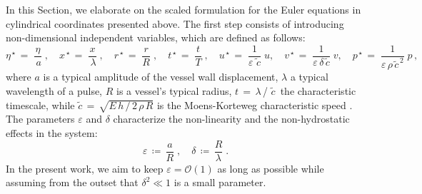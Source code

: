 \documentclass[alpha-refs, 12pt]{wiley-article}
\renewcommand{\O}{\mathcal{O}}
\newcommand{\eps}{\varepsilon}
\begin{document}
In this Section, we elaborate on the scaled formulation for the Euler equations in cylindrical coordinates presented above. The first step consists of introducing non-dimensional independent variables, which are defined as follows:
\begin{equation*}
  \eta^{\,\star}\,=\;\frac{\eta}{\,a}\;,\quad x^{\,\star}\,=\;\frac{x}{\,\lambda}\;,\quad r^{\,\star}\,=\;\frac{r}{R}\;,\quad t^{\,\star}\,=\;\frac{t}{T}\;,\quad u^{\,\star}\,=\;\frac{1}{\eps\, \tilde{\,c}}\;u, \quad v^{\,\star}\,=\;\frac{1}{\eps\,\delta\,\tilde{c}}\;v, \quad p^{\,\star}\,=\;\frac{1}{\eps\,\rho\, \tilde{c}^{\,2}}\;p\,,
\end{equation*}
where $a$ is a typical amplitude of the vessel wall displacement, $\lambda$ a typical wavelength of a pulse, $R$ is a vessel's typical radius, $ t\,=\,\lambda$\,/\,\,$\tilde{c}\,$ the characteristic timescale, while $\tilde{c}\,=\,\sqrt{E\,h\,/\,2\, \rho\,R}$ is the Moens-Korteweg characteristic speed \cite{Fung1997a}. The parameters $\eps$ and $\delta$ characterize the non-linearity and the non-hydrostatic effects in the system:
\begin{equation*}
  \eps\,\coloneqq\, \frac{a}{R}\;, \quad \delta\,\coloneqq\,\frac{R}{\lambda}\;.
\end{equation*}
In the present work, we aim to keep $\eps = \O(1)$ as long as possible while assuming from the outset that $\delta^2 \ll 1$ is a small parameter.
\end{document}
